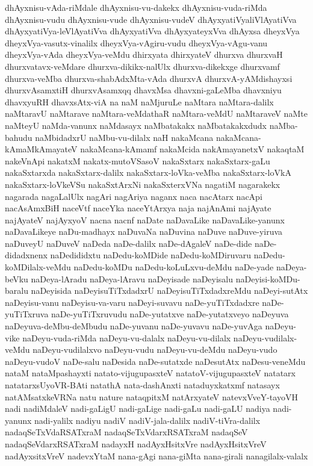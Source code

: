 {dhAyxnisu-vAda-riMdale
dhAyxnisu-vu-dakekx
dhAyxnisu-vuda-riMda
dhAyxnisu-vudu
dhAyxnisu-vude
dhAyxnisu-vudeV
dhAyxyatiVyaliVlAyatiVva
dhAyxyatiVya-leVlAyatiVva
dhAyxyatiVva
dhAyxyateyxVva
dhAyxsa
dheyxVya
dheyxVya-vasutx-vinalilx
dheyxVya-vAgiru-vudu
dheyxVya-vAgu-vanu
dheyxVya-vAda
dheyxVya-veMdu
dhirxyata
dhirxyateV
dhurxva
dhurxvaH
dhurxvatavx-veMdare
dhurxva-dikikx-nalUlx
dhurxva-dikekxge
dhurxvamf
dhurxva-veMba
dhurxva-shabAdxMta-vAda
dhurxvA
dhurxvA-yAMdishayxsi
dhurxvAsamxtiH
dhurxvAsamxqq
dhavxMsa
dhavxni-gaLeMba
dhavxniyu
dhavxyuRH
dhavxsAtx-viA
na
naM
naMjuruLe
naMtara
naMtara-dalilx
naMtaravU
naMtarave
naMtara-veMdathaR
naMtara-veMdU
naMtaraveV
naMte
naMteyU
naMda-vanunx
naMdasayx
naMbatakakx
naMbatakakxdudx
naMba-bahudu
naMbidadxrU
naMbu-vu-dilalx
naH
nakaMcana
nakaMcana-kAmaMkAmayateV
nakaMcana-kAmamf
nakaMcida
nakAmayanetxV
nakaqtaM
nakeVnApi
nakatxM
nakatx-mutoVSasoV
nakaSxtarx
nakaSxtarx-gaLu
nakaSxtarxda
nakaSxtarx-dalilx
nakaSxtarx-loVka-veMba
nakaSxtarx-loVkA
nakaSxtarx-loVkeVSu
nakaSxtArxNi
nakaSxterxVNa
nagatiM
nagarakekx
nagarada
nagaLalUlx
nagAri
nagAriya
naganx
naca
nacAtarx
nacApi
nacAsAmxBiH
naceVtf
naceYka
naceYtArxya
naja
najAnAmi
najAyate
najAyateV
najAyxyoV
nacna
nacnf
naDate
naDavaLike
naDavaLike-yanunx
naDavaLikeye
naDu-madhayx
naDuvaNa
naDuvina
naDuve
naDuve-yiruva
naDuveyU
naDuveV
naDeda
naDe-dalilx
naDe-dAgaleV
naDe-dide
naDe-didadxnenx
naDedididxtu
naDedu-koMDide
naDedu-koMDiruvaru
naDedu-koMDilalx-veMdu
naDedu-koMDu
naDedu-koLuLxvu-deMdu
naDe-yade
naDeya-beVku
naDeya-lAradu
naDeya-lAravu
naDeyisade
naDeyisalu
naDeyisi-koMDu-baralu
naDeyisida
naDeyisuTiTxdadxrU
naDeyisuTiTxdadxreMdu
naDeyi-sutAtx
naDeyisu-vanu
naDeyisu-va-varu
naDeyi-suvavu
naDe-yuTiTxdadxre
naDe-yuTiTxruva
naDe-yuTiTxruvudu
naDe-yutatxve
naDe-yutatxveyo
naDeyuva
naDeyuva-deMbu-deMbudu
naDe-yuvanu
naDe-yuvavu
naDe-yuvAga
naDeyu-vike
naDeyu-vuda-riMda
naDeyu-vu-dalalx
naDeyu-vu-dilalx
naDeyu-vudilalx-veMdu
naDeyu-vudilalxvo
naDeyu-vudu
naDeyu-vu-deMdu
naDeyu-vudo
naDeyu-vudoV
naDe-salu
naDesida
naDe-sutatxde
naDesutAtx
naDesu-veneMdu
nataM
nataMpashayxti
natato-vijugupasxteV
natatoV-vijugupasxteV
natatarx
natatarxsUyoVR-BAti
natathA
nata-dashAnxti
nataduyxkatxmf
natasayx
natAMsatxkeVRNa
natu
nature
nataqpitxM
natArxyateV
natevxVveY-tayoVH
nadi
nadiMdaleV
nadi-gaLigU
nadi-gaLige
nadi-gaLu
nadi-gaLU
nadiya
nadi-yanunx
nadi-yalilx
nadiyu
nadiV
nadiV-jala-dalilx
nadiV-tiVra-dalilx
nadaqSeTxVdaRSATxraM
nadaqSeTxVdarxRSATxraM
nadaqSeV
nadaqSeVdarxRSATxraM
nadayxH
nadAyxHsitxVre
nadAyxHsitxVreV
nadAyxsitxVreV
nadevxYtaM
nana-gAgi
nana-giMta
nana-girali
nanagilalx-valalx
}
